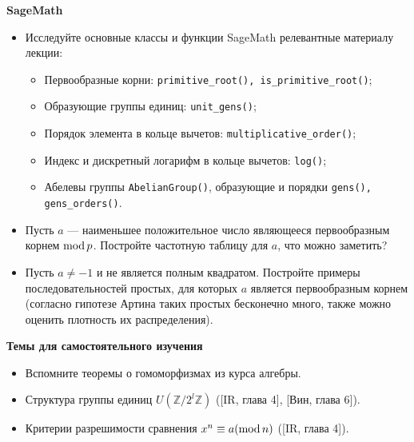 \noindent\textbf{SageMath}
\begin{itemize}[topsep=0pt]

    \item Исследуйте основные классы и функции SageMath релевантные материалу лекции:
    \begin{itemize}[noitemsep,topsep=0pt]
        \item Первообразные корни: \texttt{primitive\_root(), is\_primitive\_root()};
        \item Образующие группы единиц: \texttt{unit\_gens()};
        \item Порядок элемента в кольце вычетов: \texttt{multiplicative\_order()};
        \item Индекс и дискретный логарифм в кольце вычетов: \texttt{log()};
        \item Абелевы группы \texttt{AbelianGroup()}, образующие и порядки \texttt{gens(), gens\_orders()}.
    
    \end{itemize}

    \item Пусть $a$ --- наименьшее положительное число являющееся первообразным корнем $\operatorname{mod} p$. Постройте частотную таблицу для $a$, что можно заметить?
    \item Пусть $a\neq -1$ и не является полным квадратом. Постройте примеры последовательностей простых, для которых $a$ является первообразным корнем (согласно гипотезе Артина таких простых бесконечно много, также можно оценить плотность их распределения).
    
\end{itemize}

\noindent\textbf{Темы для самостоятельного изучения}
\begin{itemize}[topsep=0pt]
    \item Вспомните теоремы о гомоморфизмах из курса алгебры.
    \item Структура группы единиц $U(\mathbb{Z}/2^l\mathbb{Z})$ ([IR, глава 4], [Вин, глава 6]).
    \item Критерии разрешимости сравнения $x^n\equiv a (\operatorname{mod} n)$ ([IR, глава 4]).
\end{itemize}

